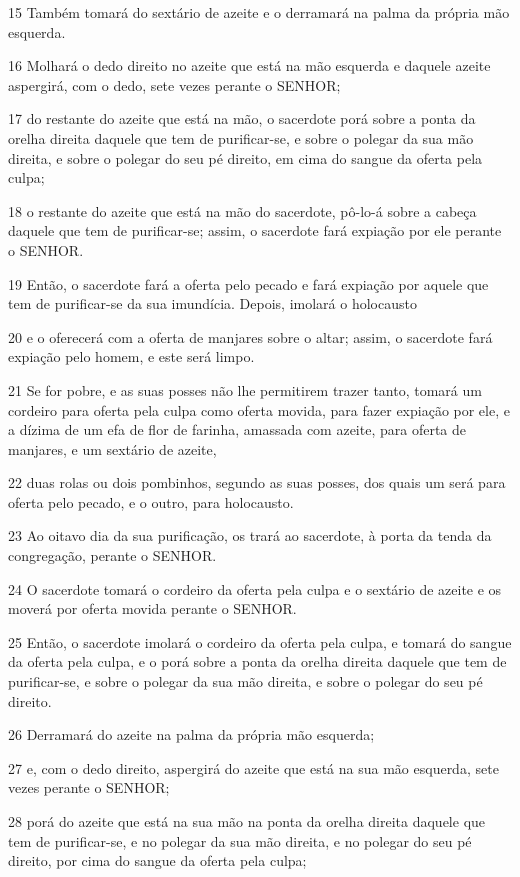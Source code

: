 \par 15 Também tomará do sextário de azeite e o derramará na palma da própria mão esquerda.
\par 16 Molhará o dedo direito no azeite que está na mão esquerda e daquele azeite aspergirá, com o dedo, sete vezes perante o SENHOR;
\par 17 do restante do azeite que está na mão, o sacerdote porá sobre a ponta da orelha direita daquele que tem de purificar-se, e sobre o polegar da sua mão direita, e sobre o polegar do seu pé direito, em cima do sangue da oferta pela culpa;
\par 18 o restante do azeite que está na mão do sacerdote, pô-lo-á sobre a cabeça daquele que tem de purificar-se; assim, o sacerdote fará expiação por ele perante o SENHOR.
\par 19 Então, o sacerdote fará a oferta pelo pecado e fará expiação por aquele que tem de purificar-se da sua imundícia. Depois, imolará o holocausto
\par 20 e o oferecerá com a oferta de manjares sobre o altar; assim, o sacerdote fará expiação pelo homem, e este será limpo.
\par 21 Se for pobre, e as suas posses não lhe permitirem trazer tanto, tomará um cordeiro para oferta pela culpa como oferta movida, para fazer expiação por ele, e a dízima de um efa de flor de farinha, amassada com azeite, para oferta de manjares, e um sextário de azeite,
\par 22 duas rolas ou dois pombinhos, segundo as suas posses, dos quais um será para oferta pelo pecado, e o outro, para holocausto.
\par 23 Ao oitavo dia da sua purificação, os trará ao sacerdote, à porta da tenda da congregação, perante o SENHOR.
\par 24 O sacerdote tomará o cordeiro da oferta pela culpa e o sextário de azeite e os moverá por oferta movida perante o SENHOR.
\par 25 Então, o sacerdote imolará o cordeiro da oferta pela culpa, e tomará do sangue da oferta pela culpa, e o porá sobre a ponta da orelha direita daquele que tem de purificar-se, e sobre o polegar da sua mão direita, e sobre o polegar do seu pé direito.
\par 26 Derramará do azeite na palma da própria mão esquerda;
\par 27 e, com o dedo direito, aspergirá do azeite que está na sua mão esquerda, sete vezes perante o SENHOR;
\par 28 porá do azeite que está na sua mão na ponta da orelha direita daquele que tem de purificar-se, e no polegar da sua mão direita, e no polegar do seu pé direito, por cima do sangue da oferta pela culpa;
